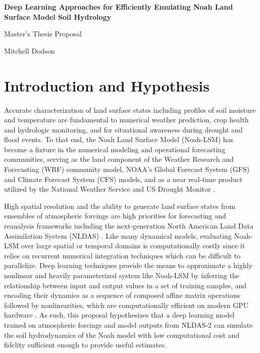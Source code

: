 \documentclass[11pt]{article}
\begin{document}
\noindent
{\Large\textbf{Deep Learning Approaches for Efficiently Emulating Noah Land Surface Model Soil Hydrology}}

\vspace{.8em}

\noindent
\large{Master's Thesis Proposal}

\noindent
\large{Mitchell Dodson}

\vspace{-.8em}

\section{Introduction and Hypothesis}

Accurate characterization of land surface states including profiles of soil moisture and temperature are fundamental to numerical weather prediction, crop health and hydrologic monitoring, and for situational awareness during drought and flood events. To that end, the Noah Land Surface Model (Noah-LSM) has become a fixture in the numerical modeling and operational forecasting communities, serving as the land component of the Weather Research and Forecasting (WRF) community model, NOAA's Global Forecast System (GFS) and Climate Forecast System (CFS) models, and as a near real-time product utilized by the National Weather Service and US Drought Monitor \cite{xia_continental-scale_2012}\cite{sorooshian_ncep_2005}\cite{mccartney_application_2023}.

High spatial resolution and the ability to generate land surface states from ensembles of atmospheric forcings are high priorities for forecasting and reanalysis frameworks including the next-generation North American Land Data Assimilation System (NLDAS) \cite{ek_next_2017}\cite{mocko_preparing_2023}. Like many dynamical models, evaluating Noah-LSM over large spatial or temporal domains is computationally costly since it relies on recurrent numerical integration techniques which can be difficult to parallelize. Deep learning techniques provide the means to approximate a highly nonlinear and heavily parameterized system like Noah-LSM by inferring the relationship between input and output values in a set of training samples, and encoding their dynamics as a sequence of composed affine matrix operations followed by nonlinearities, which are computationally efficient on modern GPU hardware \cite{lecun_deep_2015}\cite{russell_artificial_2010}. As such, this proposal hypothesizes that a deep learning model trained on atmospheric forcings and model outputs from NLDAS-2 \cite{xia_continental-scale_2012} can simulate the soil hydrodynamics of the Noah model with low computational cost and fidelity sufficient enough to provide useful estimates.
\end{document}
